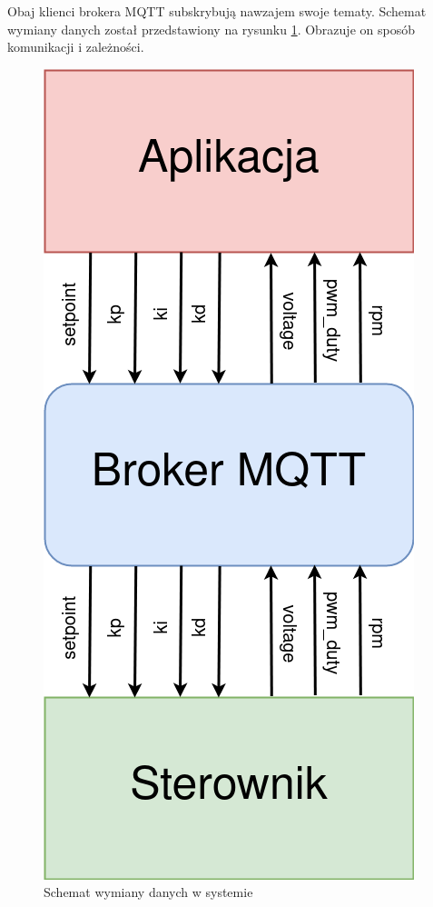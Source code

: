         Obaj klienci brokera MQTT subskrybują nawzajem swoje tematy. Schemat wymiany danych został przedstawiony na rysunku \ref{data_transmision}. Obrazuje on sposób komunikacji i zależności.
        
    
        \begin{figure}[ht]
          \centering
          \includegraphics[height=0.8\textheight]{img/dane.png}
          \caption{Schemat wymiany danych w systemie}
          \label{data_transmision}
        \end{figure}